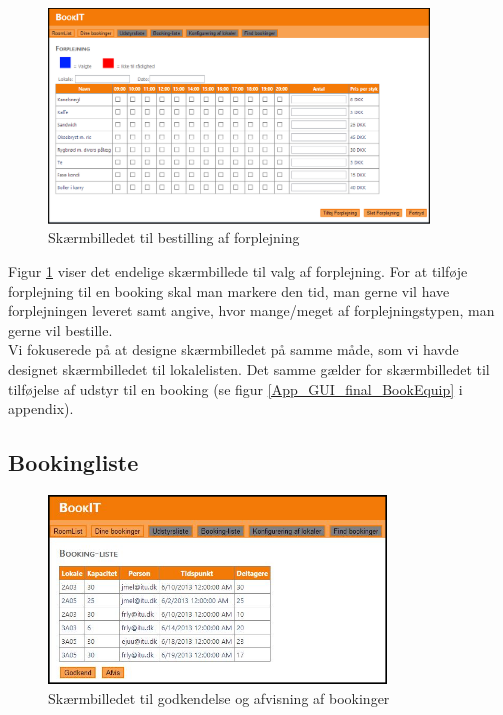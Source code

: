 \begin{figure}[h!]
  \centering
    \includegraphics[width=0.9\textwidth]{Appendix/GUI-Prototype/DigitalMockup/Forplejning}
  \caption{Skærmbilledet til bestilling af forplejning}
\label{Design_G_Development_Forplejning_Final}
\end{figure} 

Figur \ref{Design_G_Development_Forplejning_Final} viser det endelige skærmbillede til valg af forplejning. For at tilføje forplejning til en booking skal man markere den tid, man gerne vil have forplejningen leveret samt angive, hvor mange/meget af forplejningstypen, man gerne vil bestille.
\\Vi fokuserede på at designe skærmbilledet på samme måde, som vi havde designet skærmbilledet til lokalelisten. Det samme gælder for skærmbilledet til tilføjelse af udstyr til en booking (se figur \ref{App_GUI_final_BookEquip} i appendix).

\subsection{Bookingliste}
\begin{figure}[h!]
  \centering
    \includegraphics[width=0.8\textwidth]{Appendix/GUI-Prototype/DigitalMockup/BookingListe}
  \caption{Skærmbilledet til godkendelse og afvisning af bookinger}
\label{Design_G_Development_BookingListe_Final}
\end{figure} 

